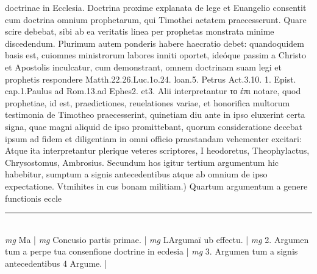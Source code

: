 \documentclass{article}
\begin{document}
\begin{pages}
doctrinae in Ecclesia. Doctrina proxime explanata de lege et Euangelio consentit cum doctrina omnium prophetarum, qui Timothei aetatem praecesserunt. Quare scire debebat, sibi ab ea veritatis linea per prophetas monstrata minime discedendum. Plurimum autem ponderis habere haecratio debet: quandoquidem basis est, cuiomnes ministrorum labores inniti oportet, ideóque  passim a Christo et Apostolis inculcatur, cum demonstrant, omnem doctrinam suam legi et prophetis respondere Matth.22.26.Luc.1o.24. loan.5. Petrus Act.3.10. 1. Epist. cap.1.Paulus ad Rom.13.ad Ephes2. et3. Alii interpretantur το ἐπι notare, quod prophetiae, id est, praedictiones, reuelationes variae, et honorifica multorum testimonia de Timotheo praecesserint, quinetiam diu ante in ipso eluxerint certa signa, quae magni aliquid de ipso promittebant, quorum consideratione decebat ipsum ad fidem et diligentiam in omni officio praestandam vehementer excitari: Atque  ita interpretantur plerique  veteres scriptores, I heodoretus, Theophylactus, Chrysostomus, Ambrosius. Secundum hos igitur tertium argumentum hic habebitur, sumptum a signis antecedentibus atque  ab omnium de ipso expectatione.  \pend\pstart Vtmihites in cus bonam militiam.) Quartum argumentum a genere functionis eccle\pend
\vspace{0.5cm}\noindent
\vspace{0.2cm}\rule{1cm}{0.2pt}\\ 
\hspace{0.2cm}\textit{mg}
\footnotesize Ma 
\normalsize| 
\hspace{0.2cm}\textit{mg}
\footnotesize Concusio partis primae. 
\normalsize| 
\hspace{0.2cm}\textit{mg}
\footnotesize LArgumaï ub effectu. 
\normalsize| 
\hspace{0.2cm}\textit{mg}
\footnotesize 2. Argumen tum a perpe tua consenfione doctrine in ecdesia 
\normalsize| 
\hspace{0.2cm}\textit{mg}
\footnotesize 3. Argumen tum a signis antecedentibus  4 Argume. 
\normalsize| 

\end{pages}
\end{document}

